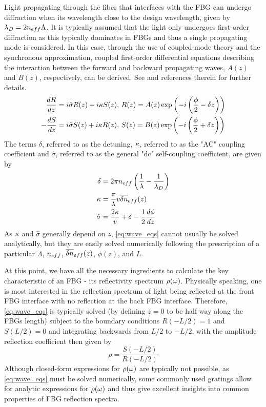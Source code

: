 %
\par
%
Light propagating through the fiber that interfaces with the FBG can undergo diffraction when its wavelength close to the design wavelength, given by $\lambda_D = 2 n_{eff} \Lambda$. 
It is typically assumed that the light only undergoes first-order diffraction as this typically dominates in FBGs and thus a single propagating mode is considered. 
In this case, through the use of coupled-mode theory and the synchronous approximation, 
coupled first-order differential equations describing the interaction between the forward and backward propagating waves, $A(z)$ and $B(z)$, respectively, can be derived. 
See \cite{erdogan1997fiber} and references therein for further details.
%
\begin{equation}
\label{eq:wave_eqs}
    \begin{aligned}
        \frac{dR}{dz} &= i \hat{\sigma} R(z) + i \kappa S(z), \, R(z) = A(z) \exp{ \left( -i \left( \frac{\phi}{2} -\delta z \right) \right) }\\
        -\frac{dS}{dz} &= i \hat{\sigma} S(z) + i \kappa R(z), \, S(z) = B(z) \exp{ \left( -i \left( \frac{\phi}{2} + \delta z \right) \right) }
    \end{aligned}
\end{equation}
%
The terms $\delta$, referred to as the detuning, $\kappa$, referred to as the "AC" coupling coefficient and $\hat{\sigma}$, referred to as the general "dc" self-coupling coefficient, are given by
%
\begin{align}
    \label{eq:delta}
    \delta &= 2 \pi n_{eff} \left( \frac{1}{\lambda} - \frac{1}{\lambda_D} \right) \\
    \label{eq:kappa}
    \kappa &= \frac{\pi}{\lambda} v \overline{\delta n}_{eff}(z)\\
    \label{eq:sigma}
    \hat{\sigma} &= \frac{2\kappa}{v} + \delta -\frac{1}{2}\frac{d\phi}{dz}
\end{align}
%
As $\kappa$ and $\hat{\sigma}$ generally depend on $z$, \eqref{eq:wave_eqs} cannot usually be solved analytically, but they are easily solved numerically following the prescription of a particular $\Lambda$, $n_{eff}$, $\overline{\delta n}_{eff}(z)$, $\phi(z)$, and $L$. 
%
\par
%
At this point, we have all the necessary ingredients to calculate the key characteristic of an FBG - its reflectivity spectrum $\rho(\omega)$. 
Physically speaking, one is most interested in the reflection spectrum of light being reflected at the front FBG interface with no reflection at the back FBG interface. 
Therefore, \eqref{eq:wave_eqs} is typically solved (by defining $z=0$ to be half way along the FBGs length) subject to the boundary conditions $R(-L/2)=1$ and $S(L/2)=0$ and integrating backwards from $L/2$ to $-L/2$, 
with the amplitude reflection coefficient then given by
%
\begin{equation}
\label{eq:rho}
    \rho = \frac{S(-L/2)}{R(-L/2)}
\end{equation}
%
Although closed-form expressions for $\rho(\omega)$ are typically not possible, as \eqref{eq:wave_eqs} must be solved numerically, 
some commonly used gratings allow for analytic expressions for $\rho(\omega)$ and thus give excellent insights into common properties of FBG reflection spectra.
%
%
